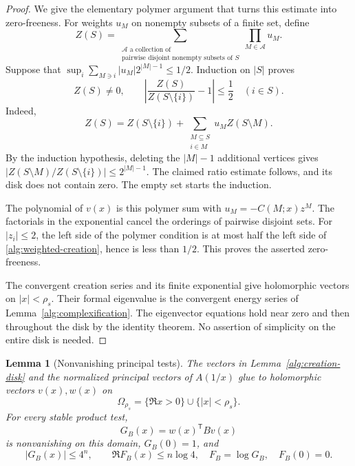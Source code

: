 \documentclass[reqno]{amsart}
\newtheorem{lemma}[theorem]{Lemma}
\theoremstyle{definition}
\theoremstyle{remark}
\begin{document}
\begin{proof}
We give the elementary polymer argument that turns this estimate
into zero-freeness.  For weights \(u_M\) on nonempty subsets of a
finite set, define
\[
 Z(S)=\sum_{\substack{\mathcal A\text{ a collection of}\\
              \text{pairwise disjoint nonempty subsets of }S}}
                       \prod_{M\in\mathcal A}u_M .
\]
Suppose that
\(\sup_i\sum_{M\ni i}|u_M|2^{|M|-1}\le1/2\).
Induction on \(|S|\) proves
\begin{equation}\label{alg:polymer-ratio}
 Z(S)\ne0,\qquad
 \left|\frac{Z(S)}{Z(S\setminus\{i\})}-1\right|\le\frac12
 \quad(i\in S).
\end{equation}
Indeed,
\[
 Z(S)=Z(S\setminus\{i\})+
           \sum_{\substack{M\subseteq S\\i\in M}}u_M Z(S\setminus M).
\]
By the induction hypothesis, deleting the \(|M|-1\) additional
vertices gives
\(\left|Z(S\setminus M)/Z(S\setminus\{i\})\right|
 \le2^{|M|-1}\).
The claimed ratio estimate follows, and its disk does not contain
zero.  The empty set starts the induction.

The polynomial of \(v(x)\) is this polymer sum with
\(u_M=-C(M;x)z^M\).  The factorials in the exponential cancel
the orderings of pairwise disjoint sets.  For \(|z_i|\le2\),
the left side of the polymer condition is at most half the
left side of \eqref{alg:weighted-creation}, hence is less than
\(1/2\).  This proves the asserted zero-freeness.

The convergent creation series and its finite exponential give
holomorphic vectors on \(|x|<\rho_s\).  Their formal eigenvalue
is the convergent energy series of
Lemma~\ref{alg:complexification}.  The eigenvector equations hold
near zero and then throughout the disk by the identity theorem.
No assertion of simplicity on the entire disk is needed.
\end{proof}

\begin{lemma}[Nonvanishing principal tests]\label{alg:test-domain}
The vectors in Lemma~\ref{alg:creation-disk} and the normalized
principal vectors of \(A(1/x)\) glue to holomorphic vectors
\(v(x),w(x)\) on
\[
 \Omega_{\rho_s}=\{\Re x>0\}\cup\{|x|<\rho_s\}.
\]
For every stable product test,
\begin{equation}\label{alg:test-function}
 G_B(x)=w(x)^{\mathsf T}Bv(x)
\end{equation}
is nonvanishing on this domain, \(G_B(0)=1\), and
\begin{equation}\label{alg:test-log-bound}
 |G_B(x)|\le4^n,\qquad
 \Re F_B(x)\le n\log4,\quad F_B=\log G_B,\quad F_B(0)=0 .
\end{equation}
\end{lemma}
\end{document}
